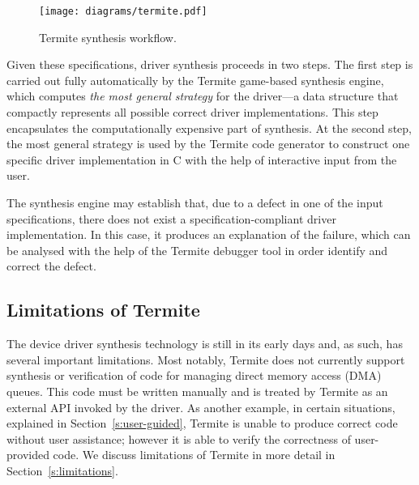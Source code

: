 \documentclass[a4paper,twoside,openright,11pt]{book}
\newcommand{\termite}{Termite\xspace}
\theoremstyle{definition}
\begin{document}
\begin{figure}
    \center
    \texttt{[image: diagrams/termite.pdf]}
    \caption{\termite synthesis workflow.}\label{f:termite}
\end{figure}

Given these specifications, driver synthesis proceeds in two steps.  The first step is carried out fully automatically by the \termite game-based synthesis engine, which computes \emph{the most general strategy} for the driver---a data structure that compactly represents all possible correct driver implementations.  This step encapsulates the computationally expensive part of synthesis.  At the second step, the most general strategy is used by the \termite code generator to construct one specific driver implementation in C with the help of interactive input from the user.

The synthesis engine may establish that, due to a defect in one of the input specifications, there does not exist a specification-compliant driver implementation.  In this case, it produces an explanation of the failure, which can be analysed with the help of the \termite debugger tool in order identify and correct the defect.

        
%
%        
%        

\subsection{Limitations of \termite}  The device driver synthesis technology is still in its early days and, as such, has several important limitations.  Most notably, \termite does not currently support synthesis or verification of code for managing direct memory access (DMA) queues.  This code must be written manually and is treated by \termite as an external API invoked by the driver.  As another example, in certain situations, explained in Section~\ref{s:user-guided}, \termite is unable to produce correct code without user assistance; however it is able to verify the correctness of user-provided code.  We discuss limitations of \termite in more detail in Section~\ref{s:limitations}.
\end{document}
